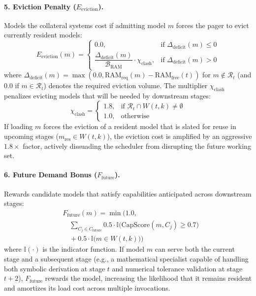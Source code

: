\paragraph{5. Eviction Penalty ($E_{\text{eviction}}$).}
Models the collateral systems cost if admitting model $m$ forces the pager to evict currently resident models:
\begin{equation}
E_{\text{eviction}}(m) = \begin{cases}
0.0, & \text{if } \Delta_{\text{deficit}}(m) \le 0 \\[3pt]
\dfrac{\Delta_{\text{deficit}}(m)}{\mathcal{B}_{\text{RAM}}} \cdot \chi_{\text{clash}}, & \text{if } \Delta_{\text{deficit}}(m) > 0
\end{cases}
\end{equation}
where $\Delta_{\text{deficit}}(m) = \max(0.0, \text{RAM}_{\text{req}}(m) - \text{RAM}_{\text{free}}(t))$ for $m \notin \mathcal{R}_t$ (and $0.0$ if $m \in \mathcal{R}_t$) denotes the required eviction volume. The multiplier $\chi_{\text{clash}}$ penalizes evicting models that will be needed by downstream stages:
\begin{equation}
\chi_{\text{clash}} = \begin{cases}
1.8, & \text{if } \mathcal{R}_t \cap W(t, k) \neq \emptyset \\
1.0, & \text{otherwise}
\end{cases}
\end{equation}
If loading $m$ forces the eviction of a resident model that is slated for reuse in upcoming stages ($m_{\text{res}} \in W(t, k)$), the eviction cost is amplified by an aggressive $1.8\times$ factor, actively dissuading the scheduler from disrupting the future working set.

\paragraph{6. Future Demand Bonus ($F_{\text{future}}$).}
Rewards candidate models that satisfy capabilities anticipated across downstream stages:
\begin{equation}
\begin{aligned}
&F_{\text{future}}(m) = \min\Bigg(1.0, \\
&\quad \sum_{C_j \in C_{\text{future}}} 0.5 \cdot \mathbb{I}\big(\text{CapScore}(m, C_j) \ge 0.7\big) \\
&\quad + 0.5 \cdot \mathbb{I}\big(m \in W(t, k)\big)\Bigg)
\end{aligned}
\end{equation}
where $\mathbb{I}(\cdot)$ is the indicator function. If model $m$ can serve both the current stage and a subsequent stage (e.g., a mathematical specialist capable of handling both symbolic derivation at stage $t$ and numerical tolerance validation at stage $t+2$), $F_{\text{future}}$ rewards the model, increasing the likelihood that it remains resident and amortizes its load cost across multiple invocations.


